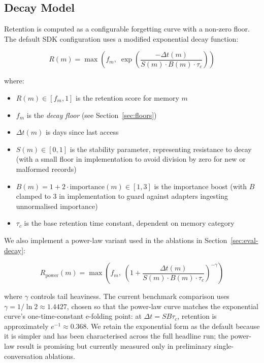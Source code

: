 \documentclass[11pt,a4paper]{article}
\begin{document}
\subsection{Decay Model}
\label{sec:decay}

Retention is computed as a configurable forgetting curve with a non-zero floor. The default SDK configuration uses a modified exponential decay function:

\begin{equation}
R(m) = \max\left(f_m,\; \exp\!\left(\frac{-\Delta t(m)}{S(m) \cdot B(m) \cdot \tau_c}\right)\right)
\label{eq:retention}
\end{equation}

\noindent where:
\begin{itemize}
    \item $R(m) \in [f_m, 1]$ is the retention score for memory $m$
    \item $f_m$ is the \emph{decay floor} (see Section~\ref{sec:floors})
    \item $\Delta t(m)$ is days since last access
    \item $S(m) \in [0, 1]$ is the stability parameter, representing resistance to decay (with a small floor in implementation to avoid division by zero for new or malformed records)
    \item $B(m) = 1 + 2 \cdot \text{importance}(m) \in [1, 3]$ is the importance boost (with $B$ clamped to 3 in implementation to guard against adapters ingesting unnormalised importance)
    \item $\tau_c$ is the base retention time constant, dependent on memory category
\end{itemize}

We also implement a power-law variant used in the ablations in Section~\ref{sec:eval-decay}:

\begin{equation}
R_{\mathrm{power}}(m) = \max\left(f_m,\; \left(1 + \frac{\Delta t(m)}{S(m) \cdot B(m) \cdot \tau_c}\right)^{-\gamma}\right)
\label{eq:power-retention}
\end{equation}

\noindent where $\gamma$ controls tail heaviness. The current benchmark comparison uses $\gamma = 1/\ln 2 \approx 1.4427$, chosen so that the power-law curve matches the exponential curve's one-time-constant e-folding point: at $\Delta t = S B \tau_c$, retention is approximately $e^{-1} \approx 0.368$. We retain the exponential form as the default because it is simpler and has been characterised across the full headline run; the power-law result is promising but currently measured only in preliminary single-conversation ablations.
\end{document}
